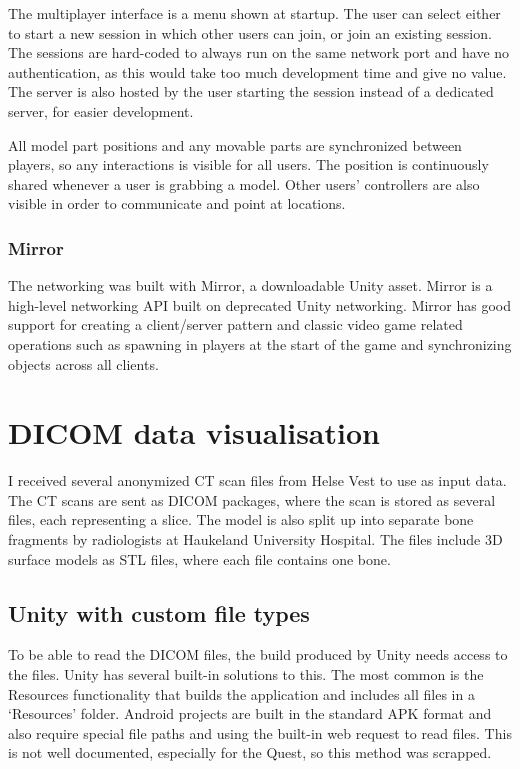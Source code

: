 \documentclass[a4paper]{report}
\begin{document}
The multiplayer interface is a menu shown at startup. The user can select either to start a new session in which other users can join, or join an existing session. The sessions are hard-coded to always run on the same network port and have no authentication, as this would take too much development time and give no value. The server is also hosted by the user starting the session instead of a dedicated server, for easier development.

All model part positions and any movable parts are synchronized between players, so any interactions is visible for all users. The position is continuously shared whenever a user is grabbing a model. Other users' controllers are also visible in order to communicate and point at locations.

\subsubsection{Mirror}
The networking was built with Mirror, a downloadable Unity asset. Mirror is a high-level networking API built on deprecated Unity networking\cite{noauthor_mirror_nodate}. Mirror has good support for creating a client/server pattern and classic video game related operations such as spawning in players at the start of the game and synchronizing objects across all clients.

\section{DICOM data visualisation}
I received several anonymized CT scan files from Helse Vest to use as input data. The CT scans are sent as DICOM packages, where the scan is stored as several files, each representing a slice.
The model is also split up into separate bone fragments by radiologists at Haukeland University Hospital. The files include 3D surface models as STL files, where each file contains one bone.


\subsection{Unity with custom file types}

To be able to read the DICOM files, the build produced by Unity needs access to the files. Unity has several built-in solutions to this.
The most common is the Resources functionality\cite{resourcesload_unity_nodate} that builds the application and includes all files in a `Resources' folder. Android projects are built in the standard APK format and also require special file paths and using the built-in web request to read files. This is not well documented, especially for the Quest, so this method was scrapped.
\end{document}
